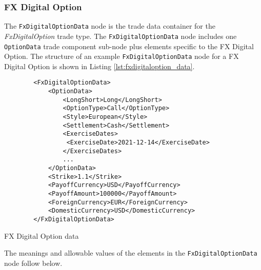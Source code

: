 \subsubsection{FX Digital Option}

\ifdefined{}\fi

The \lstinline!FxDigitalOptionData!  node is the trade data container for the \emph{FxDigitalOption} trade type.   The \lstinline!FxDigitalOptionData!  node includes one  \lstinline!OptionData! trade component sub-node  plus elements
specific to the FX Digital  Option. The structure of an example \lstinline!FxDigitalOptionData! node for a FX Digital  Option is shown in Listing
\ref{lst:fxdigitaloption_data}.

\begin{listing}[H]
\begin{verbatim}
        <FxDigitalOptionData>
            <OptionData>
                <LongShort>Long</LongShort>
                <OptionType>Call</OptionType>
                <Style>European</Style>
                <Settlement>Cash</Settlement>                
                <ExerciseDates>
                 <ExerciseDate>2021-12-14</ExerciseDate>
                </ExerciseDates> 
                ...
            </OptionData>
            <Strike>1.1</Strike>
            <PayoffCurrency>USD</PayoffCurrency>            
            <PayoffAmount>100000</PayoffAmount>            
            <ForeignCurrency>EUR</ForeignCurrency>
            <DomesticCurrency>USD</DomesticCurrency>
        </FxDigitalOptionData>
\end{verbatim}
\caption{FX Digital Option data}
\label{lst:fxdigitaloption_data}
\end{listing}

The meanings and allowable values of the elements in the \lstinline!FxDigitalOptionData!  node follow below.

